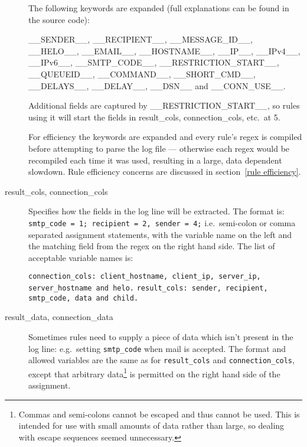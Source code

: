 \documentclass[a4paper,12pt,draft]{article}
\begin{document}
\begin{description}
        The following keywords are expanded (full explanations can be found
        in the source code):

        \_\_SENDER\_\_, \_\_RECIPIENT\_\_, \_\_MESSAGE\_ID\_\_,
        \_\_HELO\_\_, \newline \_\_EMAIL\_\_, \_\_HOSTNAME\_\_, \_\_IP\_\_,
        \_\_IPv4\_\_, \_\_IPv6\_\_, \newline \_\_SMTP\_CODE\_\_,
        \_\_RESTRICTION\_START\_\_, \_\_QUEUEID\_\_, \newline
        \_\_COMMAND\_\_, \_\_SHORT\_CMD\_\_, \_\_DELAYS\_\_, \_\_DELAY\_\_,
        \_\_DSN\_\_ and \_\_CONN\_USE\_\_.

        Additional fields are captured by \_\_RESTRICTION\_START\_\_, so
        rules using it will start the fields in result\_cols,
        connection\_cols, etc.\ at 5.

        For efficiency the keywords are expanded and every rule's regex is
        compiled before attempting to parse the log file --- otherwise each
        regex would be recompiled each time it was used, resulting in a
        large, data dependent slowdown.  Rule efficiency concerns are
        discussed in section~\ref{rule efficiency}.
        
    \item [result\_cols, connection\_cols] Specifies how the fields in the
        log line will be extracted.  The format is: \newline
        \texttt{smtp\_code = 1; recipient = 2, sender = 4;} \newline
        i.e.\ semi-colon or comma separated assignment statements, with the
        variable name on the left and the matching field from the regex on
        the right hand side.  The list of acceptable variable names is:

        \texttt{connection\_cols: client\_hostname, client\_ip, server\_ip,
        \newline server\_hostname and helo.\newline} \texttt{result\_cols:
        sender, recipient, smtp\_code, data \newline and child.}

    \item [result\_data, connection\_data] Sometimes rules need to supply a
        piece of data which isn't present in the log line: e.g.\ setting
        \texttt{smtp\_code} when mail is accepted.  The format and allowed
        variables are the same as for \texttt{result\_cols} and
        \texttt{connection\_cols}, except that arbitrary
        data\footnote{Commas and semi-colons cannot be escaped and thus
        cannot be used.  This is intended for use with small amounts of
        data rather than large, so dealing with escape sequences seemed
        unnecessary.} is permitted on the right hand side of the
        assignment.


\end{description}
\end{document}
